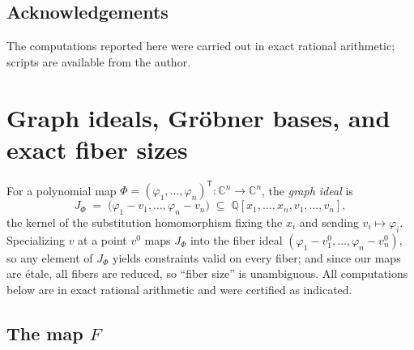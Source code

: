 \documentclass[11pt]{article}
\theoremstyle{plain}
\theoremstyle{definition}
\theoremstyle{remark}
\newcommand{\C}{\mathbb{C}}
\newcommand{\Q}{\mathbb{Q}}
\begin{document}
\subsection*{Acknowledgements}
The computations reported here were carried out in exact rational arithmetic;
scripts are available from the author.


\appendix

\section{Graph ideals, Gr\"obner bases, and exact fiber sizes}\label{app:fibers}

For a polynomial map $\Phi=(\varphi_1,\dots,\varphi_n)^{\mathsf T}\colon\C^n\to\C^n$, the
\emph{graph ideal} is
\[
J_\Phi\;=\;\bigl(\varphi_1-v_1,\dots,\varphi_n-v_n\bigr)\;\subseteq\;
\Q[x_1,\dots,x_n,v_1,\dots,v_n],
\]
the kernel of the substitution homomorphism fixing the $x_i$ and sending
$v_i\mapsto\varphi_i$. Specializing $v$ at a point $v^0$ maps $J_\Phi$ into the
fiber ideal $(\varphi_1-v_1^0,\dots,\varphi_n-v_n^0)$, so any element of
$J_\Phi$ yields constraints valid on every fiber; and since our maps are \'etale,
all fibers are reduced, so ``fiber size'' is unambiguous. All computations below
are in exact rational arithmetic and were certified as indicated.

\subsection{The map $F$}\label{app:F}
\end{document}
